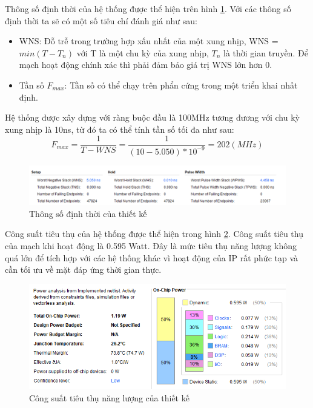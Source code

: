 Thông số định thời của hệ thống được thể hiện trên hình \ref{fig:ipTiming}. Với các thông số định thời ta sẽ có một số tiêu chí đánh giá như sau:
\begin{itemize}
	\item WNS: Đỗ trễ trong trường hợp xấu nhất của một xung nhịp, WNS = $min(T-T_n)$ với T là một chu kỳ của xung nhịp, $T_n$ là thời gian truyền. Để mạch hoạt động chính xác thì phải đảm bảo giá trị WNS lớn hơn 0.
	\item Tần số $F_{max}$: Tần số có thể chạy trên phẩn cứng trong một triển khai nhất định.
\end{itemize}
Hệ thống được xây dựng với ràng buộc đầu là 100MHz tương đương với chu kỳ xung nhịp là 10ns, từ đó ta có thể tính tần số tối đa như sau:
\begin{equation*}
	F_{max} = \frac{1}{T - WNS} = \frac{1}{(10 - 5.050)*10^{-9}} = 202   (MHz) 
\end{equation*}

\begin{figure}[!ht]
	\centering
	\includegraphics[width=\linewidth]{figures/ipTiming.png}
	\caption{Thông số định thời của thiết kế}
	\label{fig:ipTiming}
\end{figure}


Công suất tiêu thụ của hệ thống được thể hiện trong hình \ref{fig:power}. Công suất tiêu thụ của mạch khi hoạt động là 0.595 Watt. Đây là mức tiêu thụ năng lượng không quá lớn để tích hợp với các hệ thống khác vì hoạt động của IP rất phức tạp và cần tối ưu về mặt đáp ứng thời gian thực.

\begin{figure}[!ht]
	\centering
	\includegraphics[width=\linewidth]{figures/power.png}
	\caption{Công suất tiêu thụ năng lượng của thiết kế}
	\label{fig:power}
\end{figure}

